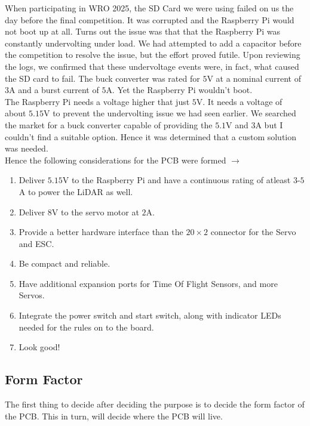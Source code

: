 \documentclass[12pt,a4paper]{article}
\begin{document}
When participating in WRO 2025, the SD Card we were using failed on us the day before the final competition. It was corrupted and the Raspberry Pi would not boot up at all. Turns out the issue was that that the Raspberry Pi was constantly undervolting under load. We had attempted to add a capacitor before the competition to resolve the issue, but the effort proved futile. Upon reviewing the logs, we confirmed that these undervoltage events were, in fact, what caused the SD card to fail. The buck converter was rated for $5$V at a nominal current of $3$A and a burst current of $5$A. Yet the Raspberry Pi wouldn't boot. \\

The Raspberry Pi needs a voltage higher that just $5$V. It needs a voltage of about $5.15$V to prevent the undervolting issue we had seen earlier. We searched the market for a buck converter capable of providing the $5.1$V and $3$A but I couldn't find a suitable option. Hence it was determined that a custom solution was needed. \\

Hence the following considerations for the PCB were formed $\rightarrow$

\begin{enumerate}
\item Deliver $5.15$V to the Raspberry Pi and have a continuous rating of atleast $3$-$5$A to power the LiDAR as well.
\item Deliver $8$V to the servo motor at $2$A.
\item Provide a better hardware interface than the $20 \times 2$ connector for the Servo and ESC.
\item Be compact and reliable.
\item Have additional expansion ports for Time Of Flight Sensors, and more Servos.
\item Integrate the power switch and start switch, along with indicator LEDs needed for the rules on to the board.
\item Look good!
\end{enumerate}

\subsection{Form Factor}

The first thing to decide after deciding the purpose is to decide the form factor of the PCB. This in turn, will decide where the PCB will live. \\
\end{document}
